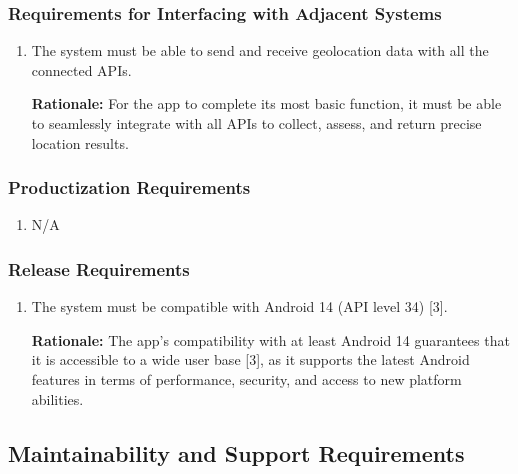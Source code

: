 \documentclass[]{article}
\begin{document}
\subsubsection{Requirements for Interfacing with Adjacent Systems}
\label{ssub:requirements_for_interfacing_with_adjacent_systems}
\begin{enumerate}[{OE-IA}1. ]
	\item The system must be able to send and receive geolocation data with all the connected APIs.
	
	{\bf Rationale:} For the app to complete its most basic function, it must be able to seamlessly integrate with all APIs to collect, assess, and return precise location results.
\end{enumerate}

\subsubsection{Productization Requirements}
\label{ssub:productization_requirements}
\begin{enumerate}[{OE-P}1. ]
	\item N/A
\end{enumerate}

\subsubsection{Release Requirements}
\label{ssub:release_requirements}
\begin{enumerate}[{OE-R}1. ]
	\item The system must be compatible with Android 14 (API level 34) [3].
	
	{\bf Rationale:} The app’s compatibility with at least Android 14 guarantees that it is accessible to a wide user base [3], as it supports the latest Android features in terms of performance, security, and access to new platform abilities.
\end{enumerate}


\subsection{Maintainability and Support Requirements}
\label{sub:maintainability_and_support_requirements}
\end{document}
